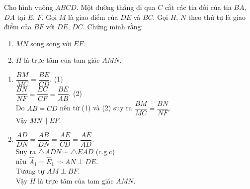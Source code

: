 \begin{bt}%
 Cho hình vuông $ABCD$. Một đường thẳng đi qua $C$ cắt các tia đối của tia $BA$, $DA$ tại $E$, $F$. Gọi $M$ là giao điểm của $DE$ và $BC$. Gọi $H$, $N$ theo thứ tự là giao điểm của $BF$ với $DE$, $DC$. Chứng minh rằng:
 \begin{enumerate}
  \item $MN$ song song với $EF$.
  \item $H$ là trực tâm của tam giác $AMN$.
 \end{enumerate}
 \loigiai
  {
  \immini
  {
  \begin{enumerate}
   \item $\dfrac{BM}{MC} = \dfrac{BE}{CD}$. \hfill (1)\\
   $\dfrac{BN}{NF} = \dfrac{EC}{CF} = \dfrac{BE}{AB}$. \hfill (2)\\
   Do $AB = CD$ nên từ (1) và (2) suy ra $\dfrac{BM}{MC} = \dfrac{BN}{NF}$.\\
   Vậy $MN \parallel EF$.
   \item $\dfrac{AD}{DN} = \dfrac{AB}{DN} = \dfrac{AE}{CD} = \dfrac{AE}{AD}$.\\
   Suy ra $\triangle ADN \backsim \triangle EAD$ (c.g.c)\\
   nên $\widehat{A}_1 = \widehat{E}_1 \Rightarrow AN \perp DE$.\\
   Tương tự $AM \perp BF$.\\
   Vậy $H$ là trực tâm của tam giác $AMN$.
  \end{enumerate}
  }
  {
  }
  }
\end{bt}
